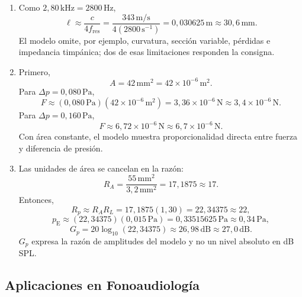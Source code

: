 \begin{enumerate}[label=\textbf{N\arabic*.},leftmargin=*]
    \item Como \(2{,}80\,\text{kHz}=2800\,\text{Hz}\),
    \[
        \ell\approx\frac{c}{4f_\mathrm{res}}
        =\frac{343\,\text{m}/\text{s}}
               {4(2800\,\text{s}^{-1})}
        =0{,}030625\,\text{m}
        \approx30{,}6\,\text{mm}.
    \]
    El modelo omite, por ejemplo, curvatura, sección variable, pérdidas e
    impedancia timpánica; dos de esas limitaciones responden la consigna.

    \item Primero,
    \[
        A=42\,\text{mm}^2=42\times10^{-6}\,\text{m}^2.
    \]
    Para \(\Delta p=0{,}080\,\text{Pa}\),
    \[
        F\approx(0{,}080\,\text{Pa})
                  (42\times10^{-6}\,\text{m}^2)
          =3{,}36\times10^{-6}\,\text{N}
          \approx3{,}4\times10^{-6}\,\text{N}.
    \]
    Para \(\Delta p=0{,}160\,\text{Pa}\),
    \[
        F\approx6{,}72\times10^{-6}\,\text{N}
          \approx6{,}7\times10^{-6}\,\text{N}.
    \]
    Con área constante, el modelo muestra proporcionalidad directa entre
    fuerza y diferencia de presión.

    \item Las unidades de área se cancelan en la razón:
    \[
        R_A=\frac{55\,\text{mm}^2}{3{,}2\,\text{mm}^2}
            =17{,}1875\approx17.
    \]
    Entonces,
    \[
        R_p\approx R_A R_L
        =17{,}1875(1{,}30)
        =22{,}34375\approx22,
    \]
    \[
        p_\mathrm{E}\approx
        (22{,}34375)(0{,}015\,\text{Pa})
        =0{,}33515625\,\text{Pa}
        \approx0{,}34\,\text{Pa},
    \]
    \[
        G_p=20\log_{10}(22{,}34375)
        \approx26{,}98\,\text{dB}
        \approx27{,}0\,\text{dB}.
    \]
    \(G_p\) expresa la razón de amplitudes del modelo y no un nivel absoluto
    en dB SPL.
\end{enumerate}

\subsection*{Aplicaciones en Fonoaudiología}

